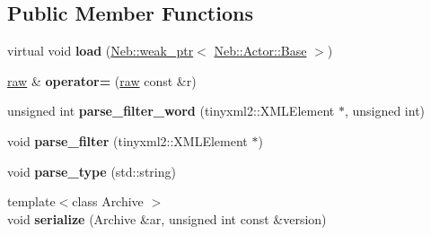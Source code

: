 \subsection*{\-Public \-Member \-Functions}
\begin{DoxyCompactItemize}
\item 
\hypertarget{classNeb_1_1Actor_1_1raw_a0844b48f128459f33752af820557a869}{virtual void {\bfseries load} (\hyperlink{classNeb_1_1weak__ptr}{\-Neb\-::weak\-\_\-ptr}$<$ \hyperlink{classNeb_1_1Actor_1_1Base}{\-Neb\-::\-Actor\-::\-Base} $>$)}\label{classNeb_1_1Actor_1_1raw_a0844b48f128459f33752af820557a869}

\item 
\hypertarget{classNeb_1_1Actor_1_1raw_aaa1450b77b3b9eddaed3acbeb1979f2c}{\hyperlink{classNeb_1_1Actor_1_1raw}{raw} \& {\bfseries operator=} (\hyperlink{classNeb_1_1Actor_1_1raw}{raw} const \&r)}\label{classNeb_1_1Actor_1_1raw_aaa1450b77b3b9eddaed3acbeb1979f2c}

\item 
\hypertarget{classNeb_1_1Actor_1_1raw_a4754eca5b0d5288e337c4ba427b6f22f}{unsigned int {\bfseries parse\-\_\-filter\-\_\-word} (tinyxml2\-::\-X\-M\-L\-Element $\ast$, unsigned int)}\label{classNeb_1_1Actor_1_1raw_a4754eca5b0d5288e337c4ba427b6f22f}

\item 
\hypertarget{classNeb_1_1Actor_1_1raw_a7617355596199f06b66560c6db88454c}{void {\bfseries parse\-\_\-filter} (tinyxml2\-::\-X\-M\-L\-Element $\ast$)}\label{classNeb_1_1Actor_1_1raw_a7617355596199f06b66560c6db88454c}

\item 
\hypertarget{classNeb_1_1Actor_1_1raw_a4d4ef0f585dd00e5c5a8f6e2ad4c3059}{void {\bfseries parse\-\_\-type} (std\-::string)}\label{classNeb_1_1Actor_1_1raw_a4d4ef0f585dd00e5c5a8f6e2ad4c3059}

\item 
\hypertarget{classNeb_1_1Actor_1_1raw_af7f1b94d5569b00e66b6eabc8f29f98c}{{\footnotesize template$<$class Archive $>$ }\\void {\bfseries serialize} (\-Archive \&ar, unsigned int const \&version)}\label{classNeb_1_1Actor_1_1raw_af7f1b94d5569b00e66b6eabc8f29f98c}

\end{DoxyCompactItemize}
